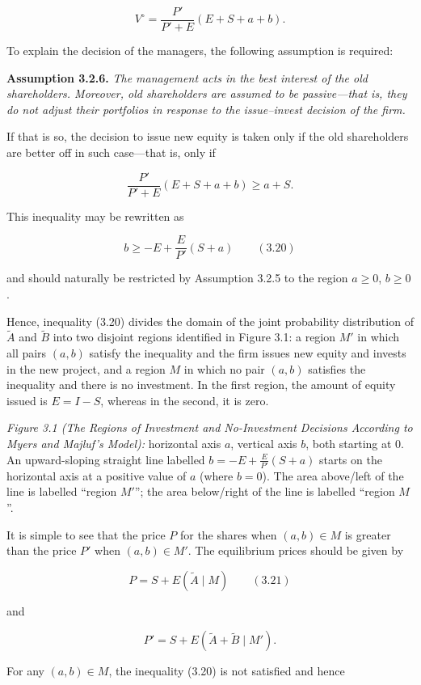 \documentclass[11pt,a4paper]{article}
\begin{document}
\[V^\circ = \frac{P'}{P' + E}(E + S + a + b).\]

To explain the decision of the managers, the following assumption is required:

\textbf{Assumption 3.2.6.} \emph{The management acts in the best interest of the old shareholders.
Moreover, old shareholders are assumed to be passive---that is, they do not adjust their portfolios
in response to the issue--invest decision of the firm.}

If that is so, the decision to issue new equity is taken only if the old shareholders are better off
in such case---that is, only if

\[\frac{P'}{P' + E}(E + S + a + b) \geq a + S.\]

This inequality may be rewritten as

\[b \geq -E + \frac{E}{P'}(S + a) \qquad (3.20)\]

and should naturally be restricted by Assumption 3.2.5 to the region \(a \geq 0\), \(b \geq 0\).

Hence, inequality (3.20) divides the domain of the joint probability distribution of
\(\widetilde{A}\) and \(\widetilde{B}\) into two disjoint regions identified in Figure 3.1: a region
\(M'\) in which all pairs \((a, b)\) satisfy the inequality and the firm issues new equity and
invests in the new project, and a region \(M\) in which no pair \((a, b)\) satisfies the inequality
and there is no investment. In the first region, the amount of equity issued is \(E = I - S\),
whereas in the second, it is zero.

\emph{Figure 3.1 (The Regions of Investment and No-Investment Decisions According to Myers and
Majluf's Model):} horizontal axis \(a\), vertical axis \(b\), both starting at 0. An upward-sloping
straight line labelled \(b = -E + \frac{E}{P'}(S + a)\) starts on the horizontal axis at a positive
value of \(a\) (where \(b = 0\)). The area above/left of the line is labelled ``region \(M'\)''; the
area below/right of the line is labelled ``region \(M\)''.

It is simple to see that the price \(P\) for the shares when \((a, b) \in M\) is greater than the
price \(P'\) when \((a, b) \in M'\). The equilibrium prices should be given by

\[P = S + E(\widetilde{A} \mid M) \qquad (3.21)\]

and

\[P' = S + E(\widetilde{A} + \widetilde{B} \mid M').\]

For any \((a, b) \in M\), the inequality (3.20) is not satisfied and hence
\end{document}
